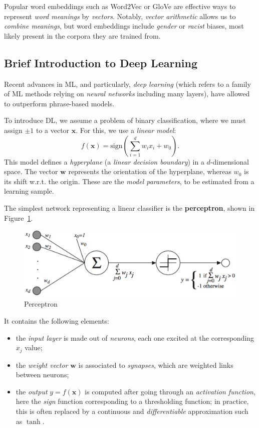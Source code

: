 Popular word embeddings such as Word2Vec or GloVe are effective ways to represent \emph{word meanings} by \emph{vectors}.
Notably, \emph{vector arithmetic} allows us to \emph{combine meanings}, but word embeddings include \emph{gender} or \emph{racist} biases, most likely present in the corpora they are trained from.

\subsection{Brief Introduction to Deep Learning}
Recent advances in ML, and particularly, \emph{deep learning} (which refers to a family of ML methods relying on \emph{neural networks} including many layers), have allowed to outperform phrase-based models.

To introduce DL, we assume a problem of binary classification, where we must assign \(\pm 1\) to a vector \(\bm{x}\).
For this, we use a \emph{linear model}:
\[
f(\bm{x}) = \mathrm{sign}\left(\sum_{i = 1}^d w_i x_i + w_0\right).
\]
This model defines a \emph{hyperplane} (a \emph{linear decision boundary}) in a \(d\)-dimensional space.
The vector \(\bm{w}\) represents the orientation of the hyperplane, whereas \(w_0\) is its shift w.r.t. the origin.
These are the \emph{model parameters}, to be estimated from a learning sample.

The simplest network representing a linear classifier is the \textbf{perceptron}, shown in Figure~\ref{fig:perceptron}.
\begin{figure}[!hbtp]
	\centering
	\includegraphics[width=\textwidth]{img/perceptron}
	\caption{Perceptron}
	\label{fig:perceptron}
\end{figure}
It contains the following elements:
\begin{itemize}
	\item the \emph{input layer} is made out of \emph{neurons}, each one excited at the corresponding \(x_j\) value;
	\item the \emph{weight vector} \(\bm{w}\) is associated to \emph{synapses}, which are weighted links between neurons;
	\item the \emph{output} \(y = f(\bm{x})\) is computed after going through an \emph{activation function}, here the \emph{sign} function corresponding to a thresholding function; in practice, this is often replaced by a continuous and \emph{differentiable} approximation such as \(\tanh\).
\end{itemize}

